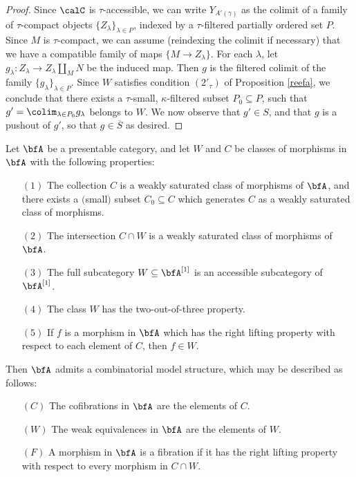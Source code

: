 \begin{proof}
Since $\calC$ is $\tau$-accessible, we can write $Y_{A'(\gamma)}$ as the colimit of a family of $\tau$-compact objects $\{ Z_{\lambda} \}_{\lambda \in P}$, indexed by a $\tau$-filtered partially ordered set $P$. Since $M$ is $\tau$-compact, we can assume (reindexing the colimit if necessary) that we have a compatible family of maps $\{ M \rightarrow Z_{\lambda} \}$. For each $\lambda$, let $g_{\lambda}: Z_{\lambda} \rightarrow Z_{\lambda} \coprod_{M} N$ be the induced map. Then $g$ is the filtered colimit of the family $\{ g_{\lambda} \}_{\lambda \in P}$. Since $W$ satisfies condition
$(2'_{\tau})$ of Proposition \ref{reefa}, we conclude that there exists a $\tau$-small, $\kappa$-filtered subset $P_0 \subseteq P$, such that $g' = \colim_{\lambda \in P_0} g_{\lambda}$ belongs to $W$. We now observe that $g' \in S$, and that $g$ is a pushout of $g'$, so that $g \in \overline{S}$ as desired.
\end{proof}

\begin{proposition}\label{bigmaker}
Let $\bfA$ be a presentable category, and let $W$ and $C$ be classes of morphisms
in $\bfA$ with the following properties:
\begin{itemize}
\item[$(1)$] The collection $C$ is a weakly saturated class of morphisms of $\bfA$, and there exists a $($small$)$ subset $C_0 \subseteq C$ which generates $C$ as a weakly saturated class of morphisms.
\item[$(2)$] The intersection $C \cap W$ is a weakly saturated class of morphisms of $\bfA$.
\item[$(3)$] The full subcategory $W \subseteq \bfA^{[1]}$ is an accessible subcategory
of $\bfA^{[1]}$.
\item[$(4)$] The class $W$ has the two-out-of-three property.
\item[$(5)$] If $f$ is a morphism in $\bfA$ which has the right lifting property with respect to each element of $C$, then $f \in W$.
\end{itemize}
Then $\bfA$ admits a combinatorial model structure, which may be described as follows:
\begin{itemize}
\item[$(C)$] The cofibrations in $\bfA$ are the elements of $C$.
\item[$(W)$] The weak equivalences in $\bfA$ are the elements of $W$.
\item[$(F)$] A morphism in $\bfA$ is a fibration if it has the right lifting property with respect to every morphism in $C \cap W$.
\end{itemize}
\end{proposition}

